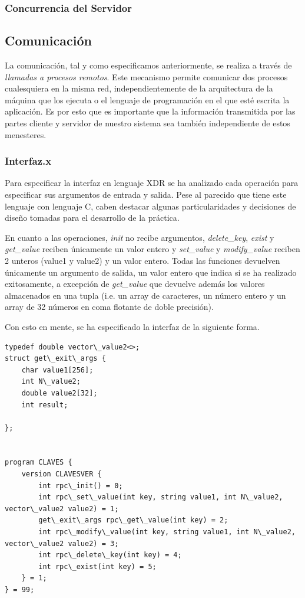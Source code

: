 \documentclass[]{article}
\begin{document}
\subsubsection{Concurrencia del Servidor}
\label{subsec::concurrencia_servidor}


\subsection{Comunicación}
\label{subsec:comunicacion}
La comunicación, tal y como especificamos anteriormente, se realiza a través de \textit{llamadas a procesos remotos}. Este mecanismo permite comunicar dos procesos cualesquiera en la misma red, independientemente de la arquitectura de la máquina que los ejecuta o el lenguaje de programación en el que esté escrita la aplicación. Es por esto que es importante que la información transmitida por las partes cliente y servidor de nuestro sistema sea también independiente de estos menesteres. 

\subsubsection{Interfaz.x}
\label{subsec:interfaz.x}
Para especificar la interfaz en lenguaje XDR se ha analizado cada operación para especificar sus argumentos de entrada y salida. Pese al parecido que tiene este lenguaje con lenguaje C, caben destacar algunas particularidades y decisiones de diseño tomadas para el desarrollo de la práctica. 

En cuanto a las operaciones, \textit{init} no recibe argumentos, \textit{delete\_key}, \textit{exist} y \textit{get\_value} reciben únicamente un valor entero y \textit{set\_value} y \textit{modify\_value} reciben 2 unteros (value1 y value2) y un valor entero. Todas las funciones devuelven únicamente un argumento de salida, un valor entero que indica si se ha realizado exitosamente, a excepción de \textit{get\_value} que devuelve además los valores almacenados en una tupla (i.e. un array de caracteres, un número entero y un array de 32 números en coma flotante de doble precisión). 

Con esto en mente, se ha especificado la interfaz de la siguiente forma. 
\begin{center}
\begin{lstlisting}[caption=Compiación de biblioteca dinámica]
typedef double vector\_value2<>;
struct get\_exit\_args {
    char value1[256];
    int N\_value2;
    double value2[32];
    int result;

};


program CLAVES {
    version CLAVESVER {
        int rpc\_init() = 0;
        int rpc\_set\_value(int key, string value1, int N\_value2, vector\_value2 value2) = 1;
        get\_exit\_args rpc\_get\_value(int key) = 2;
        int rpc\_modify\_value(int key, string value1, int N\_value2, vector\_value2 value2) = 3;
        int rpc\_delete\_key(int key) = 4; 
        int rpc\_exist(int key) = 5; 
    } = 1;
} = 99; 

\end{lstlisting}
\end{center}
\end{document}
